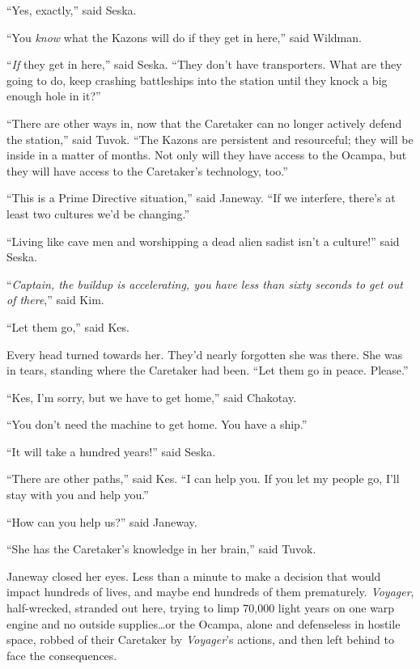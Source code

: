 \documentclass[twoside,letterpaper,12pt]{memoir}
\begin{document}
``Yes, exactly,'' said Seska. 

``You \textit{know} what the Kazons will do if they get in here,'' said Wildman. 

``\textit{If} they get in here,'' said Seska. ``They don’t have transporters. What are they going to do, keep crashing battleships into the station until they knock a big enough hole in it?'' 

``There are other ways in, now that the Caretaker can no longer actively defend the station,'' said Tuvok. ``The Kazons are persistent and resourceful; they will be inside in a matter of months. Not only will they have access to the Ocampa, but they will have access to the Caretaker’s technology, too.'' 

``This is a Prime Directive situation,'' said Janeway. ``If we interfere, there’s at least two cultures we’d be changing.'' 

``Living like cave men and worshipping a dead alien sadist isn’t a culture!'' said Seska. 

``\textit{Captain, the buildup is accelerating, you have less than sixty seconds to get out of there},'' said Kim. 

``Let them go,'' said Kes. 

Every head turned towards her. They’d nearly forgotten she was there. She was in tears, standing where the Caretaker had been. ``Let them go in peace. Please.'' 

``Kes, I’m sorry, but we have to get home,'' said Chakotay. 

``You don’t need the machine to get home. You have a ship.'' 

``It will take a hundred years!'' said Seska. 

``There are other paths,'' said Kes. ``I can help you. If you let my people go, I’ll stay with you and help you.'' 

``How can you help us?'' said Janeway. 

``She has the Caretaker’s knowledge in her brain,'' said Tuvok. 

Janeway closed her eyes. Less than a minute to make a decision that would impact hundreds of lives, and maybe end hundreds of them prematurely. \textit{Voyager}, half-wrecked, stranded out here, trying to limp 70,000 light years on one warp engine and no outside supplies\ldots or the Ocampa, alone and defenseless in hostile space, robbed of their Caretaker by \textit{Voyager}’s actions, and then left behind to face the consequences. 
\end{document}
